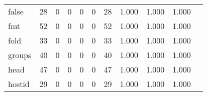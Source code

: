 \begin{longtable}{lp{1.2cm}p{1.2cm}p{1.2cm}p{1.2cm}p{1.2cm}p{1.2cm}p{1.2cm}p{1.2cm}p{1.2cm}p{1.2cm}}
false     &                                    28 &                                                  0 &                                                  0 &                                                  0 &                                                  0 &                                                 28 &                                              1.000 &                                              1.000 &                                              1.000 \\
fmt       &                                    52 &                                                  0 &                                                  0 &                                                  0 &                                                  0 &                                                 52 &                                              1.000 &                                              1.000 &                                              1.000 \\
fold      &                                    33 &                                                  0 &                                                  0 &                                                  0 &                                                  0 &                                                 33 &                                              1.000 &                                              1.000 &                                              1.000 \\
groups    &                                    40 &                                                  0 &                                                  0 &                                                  0 &                                                  0 &                                                 40 &                                              1.000 &                                              1.000 &                                              1.000 \\
head      &                                    47 &                                                  0 &                                                  0 &                                                  0 &                                                  0 &                                                 47 &                                              1.000 &                                              1.000 &                                              1.000 \\
hostid    &                                    29 &                                                  0 &                                                  0 &                                                  0 &                                                  0 &                                                 29 &                                              1.000 &                                              1.000 &                                              1.000 \\

\end{longtable}
